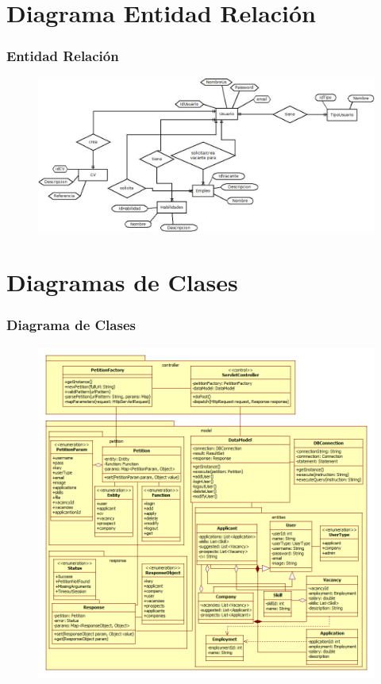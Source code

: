 \section{Diagrama Entidad Relación}
\frame
{
  \frametitle{Entidad Relación}
  
	\begin{figure}[h]
	\begin{center}
	 	\includegraphics[scale=0.30]{./resources/eer.jpg} 
	\end{center}
	\end{figure}
}


\section{Diagramas de Clases}
\frame
{
  \frametitle{Diagrama de Clases}
  
	\begin{figure}[h]
	\begin{center}
	 	\includegraphics[scale=0.30]{./resources/ClassDiagram.png} 
	\end{center}
	\end{figure}
}

